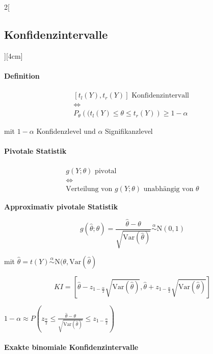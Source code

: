 \documentclass[8pt]{extarticle}
\begin{document}
\begin{multicols}{2}[\subsection{Konfidenzintervalle}][4cm]

\paragraph{Definition}
$$\begin{gathered}
\left[t_l(Y),t_r(Y)\right] \text{ Konfidenzintervall } \\
\Leftrightarrow \\
P_\theta\left((t_l(Y) \leq \theta \leq t_r(Y)\right) \geq 1-\alpha
\end{gathered}$$


\noindent mit $1-\alpha$ Konfidenzlevel und $\alpha$ Signifikanzlevel

\paragraph{Pivotale Statistik}

$$\begin{gathered}
g(Y;\theta) \text{ pivotal}\\
\Leftrightarrow \\
\text{Verteilung von } g(Y;\theta) \text{ unabhängig von } \theta
\end{gathered}$$

\textbf{Approximativ pivotale Statistik}

$$g(\hat{\theta};\theta) = \frac{\hat{\theta} - \theta}{\sqrt{\textrm{Var}(\hat{\theta})}} \overset{\alpha}{\sim} \mathrm{N}(0,1)$$

mit $\hat{\theta} = t(Y) \overset{\alpha}{\sim} \mathrm{N}(\theta,\mathrm{Var}(\hat{\theta})$

$$KI = \left[ \hat{\theta} - z_{1-\frac{\alpha}{2}}\sqrt{\mathrm{Var}(\hat{\theta})}, \hat{\theta} + z_{1-\frac{\alpha}{2}}\sqrt{\mathrm{Var}(\hat{\theta})} \right]$$

\begin{Beweis}
$1-\alpha \approx P \left( z_{\frac{\alpha}{2}} \leq \frac{\hat{\theta} - \theta}{\sqrt{\textrm{Var}(\hat{\theta})}} \leq z_{1-\frac{\alpha}{2}}\right)$
\end{Beweis}

\paragraph{Exakte binomiale Konfidenzintervalle}


\end{multicols}
\end{document}
